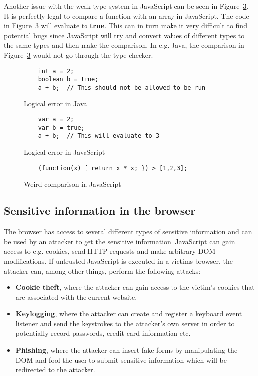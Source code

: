 Another issue with the weak type system in JavaScript can be seen in Figure~\ref{fig:js_comparison}. It is perfectly legal to compare a function with an array in JavaScript. The code in Figure~\ref{fig:js_comparison} will evaluate to \textbf{true}. This can in turn make it very difficult to find potential bugs since JavaScript will try and convert values of different types to the same types and then make the comparison. In e.g. Java, the comparison in Figure~\ref{fig:js_comparison} would not go through the type checker.
\begin{figure}[h]
  \lstset{language=Java}
  \begin{lstlisting}
    int a = 2;
    boolean b = true;
    a + b;  // This should not be allowed to be run
  \end{lstlisting}
  \caption{Logical error in Java}
  \label{fig:error_java}
\end{figure}
\begin{figure}[h]
  \begin{lstlisting}
    var a = 2;
    var b = true;
    a + b;  // This will evaluate to 3
  \end{lstlisting}
  \caption{Logical error in JavaScript}
  \label{fig:error_js}
\end{figure}
\begin{figure}[h]
  \begin{lstlisting}
    (function(x) { return x * x; }) > [1,2,3];
  \end{lstlisting}
  \caption{Weird comparison in JavaScript}
  \label{fig:js_comparison}
\end{figure}

\subsection{Sensitive information in the browser}
The browser has access to several different types of sensitive information and can be used by an attacker to get the sensitive information. JavaScript can gain access to e.g. cookies, send HTTP requests and make arbitrary DOM modifications. If untrusted JavaScript is executed in a victims browser, the attacker can, among other things, perform the following attacks:
\begin{itemize}
  \item \textbf{Cookie theft}, where the attacker can gain access to the victim's cookies that are associated with the current website.
  \item \textbf{Keylogging}, where the attacker can create and register a keyboard event listener and send the keystrokes to the attacker's own server in order to potentially record passwords, credit card information etc.
  \item \textbf{Phishing}, where the attacker can insert fake forms by manipulating the DOM and fool the user to submit sensitive information which will be redirected to the attacker.
\end{itemize}
